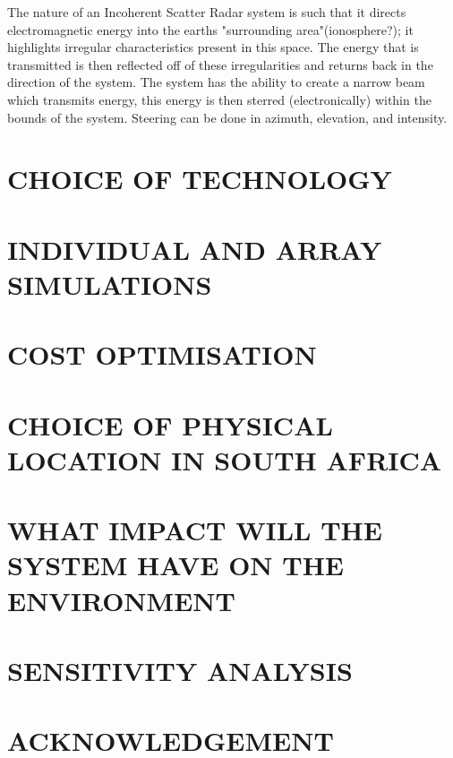 \documentclass[11pt]{witseiepaper}
\begin{document}
The nature of an Incoherent Scatter Radar system is such that it directs electromagnetic energy into the earths "surrounding area"(ionosphere?); it highlights irregular characteristics present in this space. The energy that is transmitted is then reflected off of these irregularities and returns back in the direction of the system.
The system has the ability to create a narrow beam which transmits energy, this energy is then sterred (electronically) within the bounds of the system. Steering can be done in azimuth, elevation, and intensity. 
\section{CHOICE OF TECHNOLOGY}

\section{INDIVIDUAL AND ARRAY SIMULATIONS}

\section{COST OPTIMISATION}

\section{CHOICE OF PHYSICAL LOCATION IN SOUTH AFRICA}

\section{WHAT IMPACT WILL THE SYSTEM HAVE ON THE ENVIRONMENT}

\section{SENSITIVITY ANALYSIS}

\section*{ACKNOWLEDGEMENT} \label{sec:ACKNOWLEDGEMENT}


%




\end{document}
